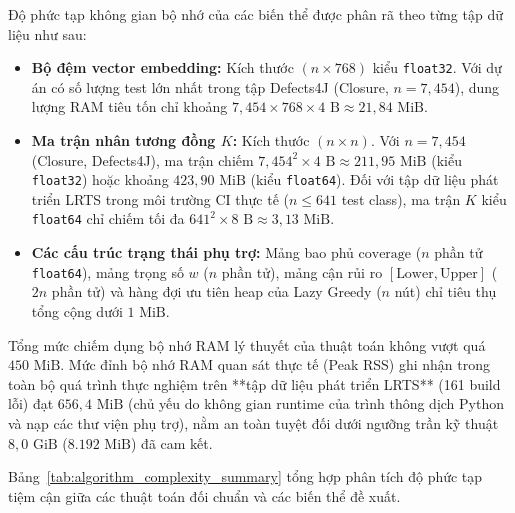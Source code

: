 Độ phức tạp không gian bộ nhớ của các biến thể được phân rã theo từng tập dữ liệu như sau:
\begin{itemize}
    \item \textbf{Bộ đệm vector embedding:} Kích thước $(n \times 768)$ kiểu \texttt{float32}. Với dự án có số lượng test lớn nhất trong tập Defects4J (Closure, $n = 7{,}454$), dung lượng RAM tiêu tốn chỉ khoảng $7{,}454 \times 768 \times 4\text{ B} \approx 21{,}84\text{ MiB}$.
    \item \textbf{Ma trận nhân tương đồng $K$:} Kích thước $(n \times n)$. Với $n = 7{,}454$ (Closure, Defects4J), ma trận chiếm $7{,}454^2 \times 4\text{ B} \approx 211{,}95\text{ MiB}$ (kiểu \texttt{float32}) hoặc khoảng $423{,}90\text{ MiB}$ (kiểu \texttt{float64}). Đối với tập dữ liệu phát triển LRTS trong môi trường CI thực tế ($n \le 641$ test class), ma trận $K$ kiểu \texttt{float64} chỉ chiếm tối đa $641^2 \times 8\text{ B} \approx 3{,}13\text{ MiB}$.
    \item \textbf{Các cấu trúc trạng thái phụ trợ:} Mảng bao phủ $\text{coverage}$ ($n$ phần tử \texttt{float64}), mảng trọng số $w$ ($n$ phần tử), mảng cận rủi ro $[\text{Lower}, \text{Upper}]$ ($2n$ phần tử) và hàng đợi ưu tiên heap của Lazy Greedy ($n$ nút) chỉ tiêu thụ tổng cộng dưới $1\text{ MiB}$.
\end{itemize}

Tổng mức chiếm dụng bộ nhớ RAM lý thuyết của thuật toán không vượt quá $450\text{ MiB}$. Mức đỉnh bộ nhớ RAM quan sát thực tế (Peak RSS) ghi nhận trong toàn bộ quá trình thực nghiệm trên **tập dữ liệu phát triển LRTS** (161 build lỗi) đạt $656{,}4\text{ MiB}$ (chủ yếu do không gian runtime của trình thông dịch Python và nạp các thư viện phụ trợ), nằm an toàn tuyệt đối dưới ngưỡng trần kỹ thuật $8{,}0\text{ GiB}$ ($8.192\text{ MiB}$) đã cam kết.

Bảng~\ref{tab:algorithm_complexity_summary} tổng hợp phân tích độ phức tạp tiệm cận giữa các thuật toán đối chuẩn và các biến thể đề xuất.

